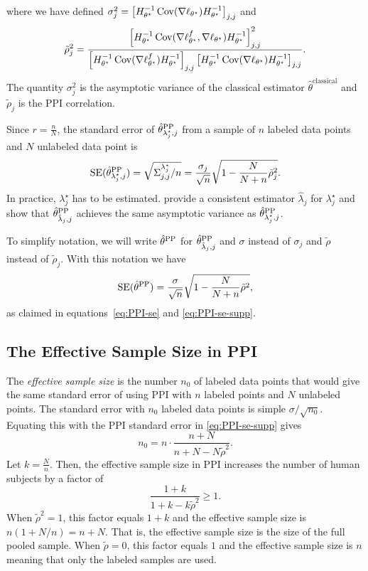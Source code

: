 where we have defined $\sigma^2_j = \left[H^{-1}_{\theta^\star}\operatorname*{Cov}(\nabla \ell_{\theta^\star})H^{-1}_{\theta^\star}\right]_{j,j}$ and
\begin{equation}\label{eq:PPI_corr}
    \tilde{\rho}^2_j =   \frac{\left[H^{-1}_{\theta^\star}\operatorname*{Cov}(\nabla \ell_{\theta^\star}^f,\nabla\ell_{\theta^\star})H^{-1}_{\theta^\star}\right]_{j,j}^2}{\left[H^{-1}_{\theta^\star}\operatorname*{Cov}(\nabla \ell_{\theta^\star}^f)H^{-1}_{\theta^\star}\right]_{j,j}\left[H^{-1}_{\theta^\star}\operatorname*{Cov}(\nabla \ell_{\theta^\star})H^{-1}_{\theta^\star}\right]_{j,j}}.
\end{equation}
The quantity $\sigma_j^2$ is the asymptotic variance of the classical estimator $\hat{\theta}^{\mathrm{classical}}$ and $\tilde{\rho}_j$ is the PPI correlation. 

Since $r=\frac{n}{N}$, the standard error of $\hat{\theta}^{\mathrm{PP}}_{\lambda^\star_j,j}$ from a sample of $n$ labeled data points and $N$ unlabeled data point is
\[
   \mathrm{SE}(\hat{\theta}^{\mathrm{PP}}_{\lambda^\star_j, j})= \sqrt{\Sigma_{j,j}^{\lambda^\star_j}/n} = \frac{\sigma_j}{\sqrt{n}}\sqrt{1-\frac{N}{N+n}\tilde{\rho}^2_j}.  
\]
In practice, $\lambda^\star_j$ has to be estimated. \cite{angelopoulos2024ppi} provide a consistent estimator $\hat{\lambda}_j$ for $\lambda^\star_j$ and show that $\hat{\theta}_{\hat{\lambda}_j,j}^{\mathrm{PP}}$ achieves the same asymptotic variance as $\hat{\theta}^{\mathrm{PP}}_{\lambda^\star_j,j}$. 

To simplify notation, we will write $\hat{\theta}^{\mathrm{PP}}$ for $\hat{\theta}^{\mathrm{PP}}_{\hat{\lambda}_j,j}$ and $\sigma$ instead of $\sigma_j$ and $\tilde{\rho}$ instead of $\tilde{\rho}_j$. With this notation we have
\[ 
    \mathrm{SE}(\hat{\theta}^{\mathrm{PP}}) = \frac{\sigma}{\sqrt{n}}\sqrt{1-\frac{N}{N+n}\tilde{\rho}^2},
\]
as claimed in equations~\eqref{eq:PPI-se} and \eqref{eq:PPI-se-supp}.

\subsection{The Effective Sample Size in PPI}\label{sec:effective-sample-size}

The \emph{effective sample size} is the number $n_0$ of labeled data points that would give the same standard error of using PPI with $n$ labeled points and $N$ unlabeled points. The standard error with $n_0$ labeled data points is simple $\sigma/\sqrt{n_0}$. Equating this with the PPI standard error in \eqref{eq:PPI-se-supp} gives
\[
    n_0 = n \cdot \frac{n+N}{n+N-N\tilde{\rho}^2}. 
\]
Let $k = \frac{N}{n}$. Then, the effective sample size in PPI increases the number of human subjects by a factor of 
\[ 
    \frac{1+k}{1+k-k\tilde{\rho}^2} \ge 1.
\]
When $\tilde{\rho}^2=1$, this factor equals $1+k$ and the effective sample size is $n(1+N/n)=n+N$. That is, the effective sample size is the size of the full pooled sample. When $\tilde{\rho}=0$, this factor equals $1$ and the effective sample size is $n$ meaning that only the labeled samples are used.


